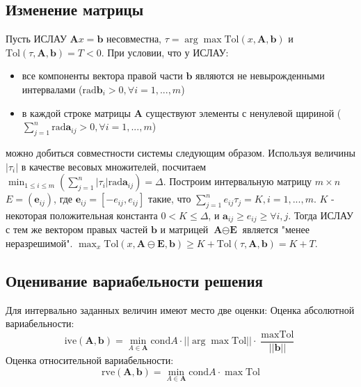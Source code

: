 \documentclass[a4paper,12pt]{article}
\begin{document}
    \subsection{Изменение матрицы}
    Пусть ИСЛАУ $ \textbf{A}x = \textbf{b} $ несовместна, $ \tau = \arg\max\text{Tol}(x, \textbf{A}, \textbf{b}) $ и $ \text{Tol}(\tau, \textbf{A}, \textbf{b}) = T < 0 $.
    При условии, что у ИСЛАУ:
    \begin{itemize}
        \item все компоненты вектора правой части $ \textbf{b} $ являются не невырожденными интервалами ($ \text{rad}\textbf{b}_{i} > 0, \forall i = 1, ..., m $)
        \item в каждой строке матрицы $ \textbf{A} $ существуют элементы с ненулевой щириной ($ \sum_{j = 1}^{n}\text{rad}\textbf{a}_{ij} > 0, \forall i = 1, ..., m $)
    \end{itemize}
    можно добиться совместности системы следующим образом. \newline
    Используя величины $ | \tau_{i} | $ в качестве весовых множителей, посчитаем \newline
    $ \min_{1 \leq i \leq m}(\sum_{j = 1}^{n}| \tau_{i} | \text{rad}\textbf{a}_{ij}) = \Delta $.
    Построим интервальную матрицу $ m \times n $ $ E = (\textbf{e}_{ij}) $, где $ \textbf{e}_{ij} = [-e_{ij}, e_{ij}] $ такие, что $ \sum_{j = 1}^{n}e_{ij}\tau_{j} = K, i = 1, ..., m $.
    $ K $ - некоторая положительная константа $ 0 < K \leq \Delta $, и $ \textbf{a}_{ij} \geq e_{ij} \geq \forall i, j $. \newline
    Тогда ИСЛАУ с тем же вектором правых частей $ \textbf{b} $ и матрицей $ \textbf{A} \ominus \textbf{E} $ является "менее неразрешимой". \newline
    $ \max_{x}\text{Tol}(x, \textbf{A} \ominus \textbf{E}, \textbf{b}) \geq K + \text{Tol}(\tau, \textbf{A}, \textbf{b}) = K + T $.

    \subsection{Оценивание вариабельности решения}
    Для интервально заданных величин имеют место две оценки: \newpage
    Оценка абсолютной вариабельности: 
    \begin{equation}
        \text{ive}(\textbf{A}, \textbf{b}) = \min_{A \in \textbf{A}} \text{cond}A \cdot || \arg\max \text{Tol} || \cdot \frac{\max \text{Tol}}{|| \textbf{b} ||}
    \end{equation}
    \noindent
    Оценка относительной вариабельности:
    \begin{equation}
        \text{rve}(\textbf{A}, \textbf{b}) = \min_{A \in \textbf{A}} \text{cond}A \cdot \max\text{Tol}
    \end{equation}
\end{document}
